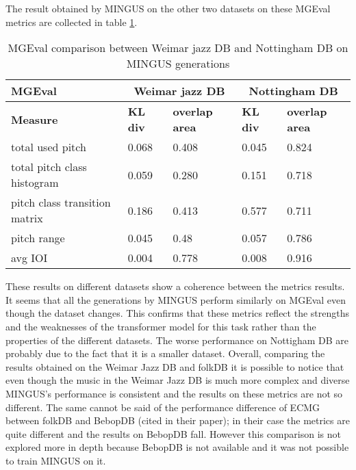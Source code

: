 \documentclass{article}
\begin{document}
The result obtained by MINGUS on the other two datasets on these MGEval metrics are collected in table \ref{tab:MGEval jazz, nottingham}.

\begin{table}[htbp]
	\caption{MGEval comparison between Weimar jazz DB and Nottingham DB on MINGUS generations}
	\begin{center}
		\begin{tabular}{ p{5cm} p{1.5cm} p{2.2cm} p{1.5cm} p{2.2cm}  }
            \hline
            MGEval & 
            \multicolumn{2}{c}{\textbf{Weimar jazz DB}} & 
            \multicolumn{2}{c}{\textbf{Nottingham DB}} \\
            \hline
            \textbf{Measure} &  
            \textbf{KL div} & 
            \textbf{overlap area} &
            \textbf{KL div} & 
            \textbf{overlap area} \\
            \hline
            \hline
            total used pitch & 0.068 & 0.408 & 0.045 & 0.824 \\
            total pitch class histogram & 0.059 & 0.280 & 0.151 & 0.718 \\
            pitch class transition matrix & 0.186 & 0.413 & 0.577 & 0.711 \\
            pitch range & 0.045 & 0.48 & 0.057 & 0.786 \\
            avg IOI & 0.004 & 0.778 & 0.008 & 0.916 \\
            \hline
    \end{tabular}
	\label{tab:MGEval jazz, nottingham}
	\end{center}
\end{table}

These results on different datasets show a coherence between the metrics results. It seems that all the generations by MINGUS perform similarly on MGEval even though the dataset changes. This confirms that these metrics reflect the strengths and the weaknesses of the transformer model for this task rather than the properties of the different datasets. The worse performance on Nottigham DB are probably due to the fact that it is a smaller dataset. Overall, comparing the results obtained on the Weimar Jazz DB and folkDB it is possible to notice that even though the music in the Weimar Jazz DB is much more complex and diverse MINGUS's performance is consistent and the results on these metrics are not so different. The same cannot be said of the performance difference of ECMG between folkDB and BebopDB (cited in their paper); in their case the metrics are quite different and the results on BebopDB fall. However this comparison is not explored more in depth because BebopDB is not available and it was not possible to train MINGUS on it.
\end{document}
